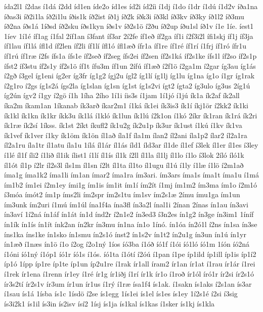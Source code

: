{ída2l1
í2das
í1dá
í2dd
íd1en
íde2o
íd1es
íd2i
íd2íi
í1dj
í1do
í1dr
í1dú
í1d2v
íða1na
íðas3i
íð2i1la
íð2i1lu
íðis1k
íð2ist
íð1j
íð2k
íðk3i
íð3kl
íð3kv
íð3ky
íð1l2
íð3mu
íð2na
íðs1á
1íðsd
íð2sku
íðs1kyn
íðs1v
íð2s1ö
í2ðu
íð2up
íðu1sl
íð1v
í1e
1íe.
íest1
1íev
1í1é
íf1ag
í1fal
2íf1an
í3fant
íf3ar
2í2fe
íf1eð
íf2ga
íf1i
í2f3i2l
ífi1skj
íf1j
íf3ja
íf1lau
íf1lá
ífl1d
íf2len
íf2li
íf1lí
ífl1ó
ífl1æð
ífr1a
íf1re
íf1ré
íf1rí
í1frj
íf1ró
ífr1u
íf1rú
íf1ræ
í2fs
ífs1a
ífs1e
íf2seð
íf2seg
ífs2ei
íf2sen
íf2s1ká
íf2s1ke
ífs1l
íf2so
íf2s1p
ífst2
íf3stu
íf2s1y
íf2s1ö
íf1t
ífu3m
íf1un
2ífú
íf1æð
í2f1ö
í2ga1m
í2gar
íg3au
íg1ás
í2gð
í3gel
íg1eni
íg2er
íg3fr
íg1g2
ígj2u
ígl2
íg1lí
íg1lj
íg1lu
íg1na
íg1o
í1gr
íg1rak
í2g1ro
í2gs
íg1s2á
ígs2la
íg1slan
íg1sn
íg1st
íg1s2vi
ígt2
ígta2
íg3ulo
íg3us
2íg1ú
íg2ún
ígv2
í1gy
í2gö
í1h
1íha
2ího
1í1i
íis3s
í1jam
1í1jó
í1jú
ík1a
ík2af
ík2all
íka2m
íkam1an
1íkanab
ík3arð
íkar2m1
í1ká
ík1ei
ík3is3
ík1í
íkj1ör
í2kk2
ík1ki
ík1kl
ík1kn
ík1kr
íkk3u
ík1lá
í1kló
ík1lun
ík1lú
í2k1on
í1kó
2íkr
ík1ran
ík1rá
ík2ri
ík1ræ
ík2sí
1íkss.
ík1st
2íkt
íkufl2
ík1u2g
ík2u1p
ík3ur
ík1ust
í1kú
í1kv
ík1va
ík1vef
ík1ver
í1ky
ík1öm
ík1ön
íl1að
íla1f
íla1m
ílan2
íl2ani
íla1p2
ílar2
íl2a1ra
íl2a1ru
íla1tr
íl1atu
íla1u
1ílá
íl1ár
íl1ás
íld1
íld3ar
íl1de
íl1ef
í3lek
íl1er
íl1es
í3ley
í1lé
íl1f
íli2
í1lið
íl1ik
ílist1
í1lí
íl1ís
íl1k
í2ll
íl1la
íl1lj
íl1lo
í1lo
í3lok
2íló
íló1k
íl1ót
íl1p
í2lr
íl2s3l
íls1m
íl1sn
í2lt
íl1ta
íl1to
íl1ugu
íl1ú
í1ly
í1læ
í1lö
í2m1að
íma1g
íma1k2
íma1li
ím1an
ímar2
íma1ra
ím3ari.
ím3ars
íma1s
íma1t
íma1u
í1má
ím1b2
ím1ei
í2m1ey
ími1g
ím1is
ím1it
ím1í
ím2ít
í1mj
ím1m2
ím3ma
ím1o
í2m1ó
í3móa
ímót2
ím1p
íms2li
ím2spr
ím2s1tu
ím1sv
ím2s1æ
2ímu
ímu1ga
ím1un
ím3unk
ím2uri
í1mú
ím1úl
ína1f4a
ína3fl
ín3a2l
ínal1i
2ínan
2ínas
ín1au
ín3avi
ín3aví
1í2ná
ín1áf
ín1át
ín1d
índ2r
í2n1e2
ín3ed3
í3n2es
ín1g2
ín3ge
ín3im1
1íníf
ín1ík
ín1ís
ín1ít
ínk2an
ín2kr
ín3mu
ín1na
ín1o
1ínó.
ín1óa
ín2ó1l
í2ns
ín1sa
ín3se
íns1ka
íns1ke
ín1sko
ín1smu
ín2s1ó
ínst2
ín1s2v
ín1t2
ín2u1g
ín3un
ín1ú
ín1yr
ín1æð
í1næs
ín1ö
í1o
í2og
í2o1ný
1íos
íó3ba
í1óð
íó1f
í1ói
íó1ló
íó1m
1íón
íó2ná
í1óni
íó1ný
í1óp1
íó1r
íó1s
í1ós.
íó1ta
í1ótí
í2óú
í1pan
í1pe
íp1ild
íp1ill
íp1is
íp1í2
íp1ó
1ípp
íp1re
íp1te
íp1un
íp2u1re
í1rak
ír1all
íram2
ír1an
ír1at
í1rau
ír1ár
í1rei
í1rek
ír1ena
í1renn
ír1ey
í1ré
ír1g
ír1iðj
í1rí
ír1k
ír1o
í1roð
ír1ól
író1r
ír2si
ír2s1ó
ír3s2tí
ír2s1v
ír3um
ír1un
ír1us
í1rý
í1ræ
ísa1f4
ís1ak.
í1sakn
ís1aks
í2s1an
ís3ar
í1sau
ís1á
1ísba
ís1c
1ísdö
í2se
ís1egg
1ís1ei
ís1el
ís1es
ís1ey
1í2s1é
í2si
í3sig
ís3i2k1
ís1il
ís3in
ís2isv
ísí2
1ísj
ís1ja
ís1kal
ís1kas
í1sker
ís1kj
ís1kla
}
